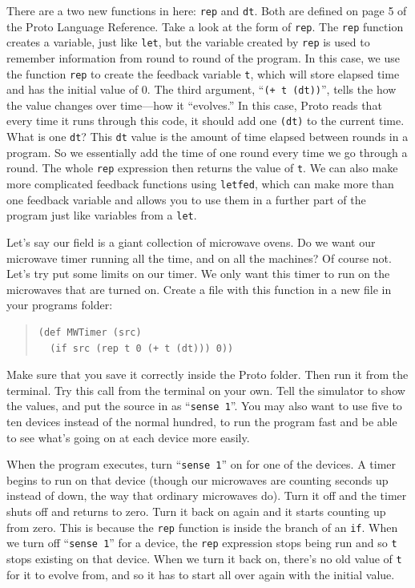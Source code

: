 \documentclass{article}
\newcommand\var[1]{{\tt #1}}
\newcommand\qvar[1]{``{\tt #1}''}
\begin{document}
There are a two new functions in here: \var{rep} and \var{dt}.  Both
are defined on page 5 of the Proto Language Reference.  Take a look at
the form of \var{rep}.  The \var{rep} function creates a variable,
just like \var{let}, but the variable created by \var{rep} is used to
remember information from round to round of the program.  In this
case, we use the function \var{rep} to create the feedback variable
\var{t}, which will store elapsed time and has the initial value of 0.
The third argument, \qvar{(+ t (dt))}, tells the how the value changes
over time---how it ``evolves.''  In this case, Proto reads that every
time it runs through this code, it should add one \var{(dt)} to the
current time.  What is one \var{dt}?  This \var{dt} value is the
amount of time elapsed between rounds in a program.  So we essentially
add the time of one round every time we go through a round.  The whole
\var{rep} expression then returns the value of \var{t}.  We can also
make more complicated feedback functions using \var{letfed}, which can
make more than one feedback variable and allows you to use them in a
further part of the program just like variables from a \var{let}.

Let's say our field is a giant collection of microwave ovens.  Do we want our
microwave timer running all the time, and on all the machines?  Of
course not.  Let's try put some limits on our timer.  We only want
this timer to run on the microwaves that are turned on.  Create a file
with this function in a new file in your programs folder:

\begin{quote}
\begin{verbatim}
(def MWTimer (src)
  (if src (rep t 0 (+ t (dt))) 0))
\end{verbatim}
\end{quote}

Make sure that you save it correctly inside the Proto folder. Then run
it from the terminal.  Try this call from the terminal on your own.  Tell the
simulator to show the values, and put the source in as \qvar{sense 1}.
You may also want to use five to ten devices instead of the normal
hundred, to run the program fast and be able to see what's going on at
each device more easily.

When the program executes, turn \qvar{sense 1} on for one of the
devices.  A timer begins to run on that device (though our microwaves
are counting seconds up instead of down, the way that ordinary
microwaves do).  Turn it off and the timer shuts off and returns to
zero.  Turn it back on again and it starts counting up from zero.
This is because the \var{rep} function is inside the branch of an
\var{if}.  When we turn off \qvar{sense 1} for a device, the \var{rep}
expression stops being run and so \var{t} stops existing on that
device.  When we turn it back on, there's no old value of \var{t} for
it to evolve from, and so it has to start all over again with the
initial value.
\end{document}
